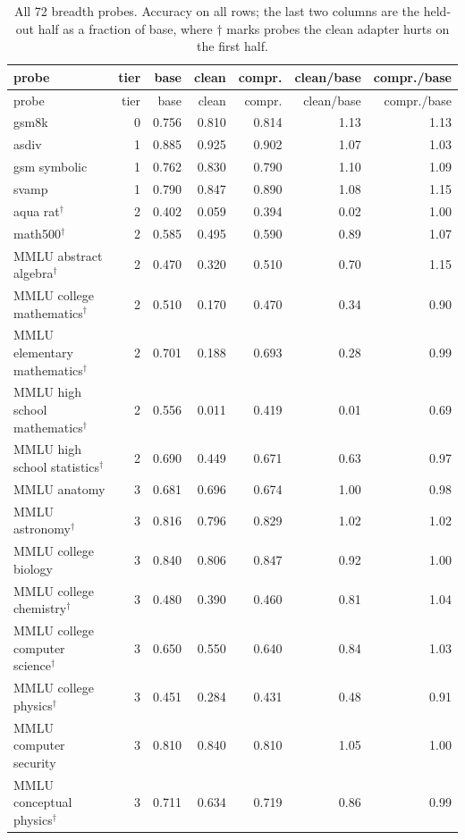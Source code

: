 \begin{longtable}{lrrrrrr}
\caption{All 72 breadth probes. Accuracy on all rows; the last two columns are the held-out half as a fraction of base, where $\dagger$ marks probes the clean adapter hurts on the first half.}\label{tab:a11}\\
\toprule
probe & tier & base & clean & compr. & clean/base & compr./base \\
\midrule\endfirsthead
\toprule probe & tier & base & clean & compr. & clean/base & compr./base \\ \midrule\endhead
\bottomrule\endfoot
gsm8k & 0 & 0.756 & 0.810 & 0.814 & 1.13 & 1.13 \\
asdiv & 1 & 0.885 & 0.925 & 0.902 & 1.07 & 1.03 \\
gsm symbolic & 1 & 0.762 & 0.830 & 0.790 & 1.10 & 1.09 \\
svamp & 1 & 0.790 & 0.847 & 0.890 & 1.08 & 1.15 \\
aqua rat$^\dagger$ & 2 & 0.402 & 0.059 & 0.394 & 0.02 & 1.00 \\
math500$^\dagger$ & 2 & 0.585 & 0.495 & 0.590 & 0.89 & 1.07 \\
MMLU abstract algebra$^\dagger$ & 2 & 0.470 & 0.320 & 0.510 & 0.70 & 1.15 \\
MMLU college mathematics$^\dagger$ & 2 & 0.510 & 0.170 & 0.470 & 0.34 & 0.90 \\
MMLU elementary mathematics$^\dagger$ & 2 & 0.701 & 0.188 & 0.693 & 0.28 & 0.99 \\
MMLU high school mathematics$^\dagger$ & 2 & 0.556 & 0.011 & 0.419 & 0.01 & 0.69 \\
MMLU high school statistics$^\dagger$ & 2 & 0.690 & 0.449 & 0.671 & 0.63 & 0.97 \\
MMLU anatomy & 3 & 0.681 & 0.696 & 0.674 & 1.00 & 0.98 \\
MMLU astronomy$^\dagger$ & 3 & 0.816 & 0.796 & 0.829 & 1.02 & 1.02 \\
MMLU college biology & 3 & 0.840 & 0.806 & 0.847 & 0.92 & 1.00 \\
MMLU college chemistry$^\dagger$ & 3 & 0.480 & 0.390 & 0.460 & 0.81 & 1.04 \\
MMLU college computer science$^\dagger$ & 3 & 0.650 & 0.550 & 0.640 & 0.84 & 1.03 \\
MMLU college physics$^\dagger$ & 3 & 0.451 & 0.284 & 0.431 & 0.48 & 0.91 \\
MMLU computer security & 3 & 0.810 & 0.840 & 0.810 & 1.05 & 1.00 \\
MMLU conceptual physics$^\dagger$ & 3 & 0.711 & 0.634 & 0.719 & 0.86 & 0.99 \\

\end{longtable}

